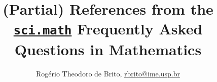 \documentclass[a4paper]{article}
\title{(Partial) References from the
  \href{news://sci.math}{\texttt{sci.math}} Frequently Asked Questions in Mathematics}
\author{Rog\'{e}rio Theodoro de Brito, \url{rbrito@ime.usp.br}}
\begin{document}
\maketitle

\nocite{*}


\end{document}

